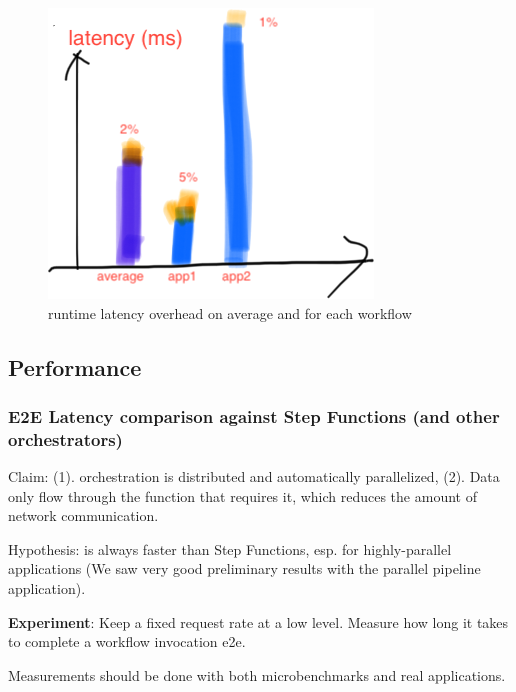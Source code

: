 \begin{figure}[t!]
    \centering
    \includegraphics[width=\columnwidth]{figures/Sketch1.png}
    \caption{\name{} runtime latency overhead on average and for each workflow}
\end{figure}

\subsection{Performance}

\subsubsection{E2E Latency comparison against Step Functions (and
other orchestrators)}

Claim: (1). orchestration is distributed and automatically parallelized, (2).
Data only flow through the function that requires it, which reduces the amount
of network communication.

Hypothesis: \name{} is always faster than Step Functions, esp. for
highly-parallel applications (We saw very good preliminary results with the
parallel pipeline application).

\textbf{Experiment}: Keep a fixed request rate at a low level. Measure how
long it takes to complete a workflow invocation e2e.

Measurements should be done with both microbenchmarks and real applications.

